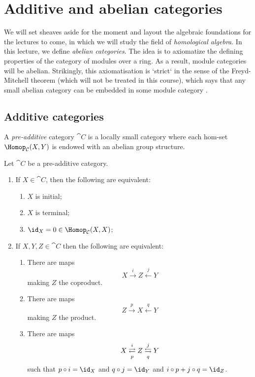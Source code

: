 \documentclass[../main.tex]{subfiles}
\begin{document}
\chapter{Additive and abelian categories}
We will set sheaves aside for the moment and layout the algebraic foundations for the lectures to come, in which we will study the field of \emph{homological algebra}. In this lecture, we define \emph{abelian categories}. The idea is to axiomatize the defining properties of the category of modules over a ring. As a result, module categories will be abelian. Strikingly, this axiomatisation is `strict` in the sense of the Freyd-Mitchell theorem (which will not be treated in this course), which says that any small abelian category can be embedded in some module category \cite[Theorem~1.6.1]{WeibelHomologicalAlgebra}. 

\section{Additive categories}
\begin{defn}
  A \emph{pre-additive} category $\cat C$ is a locally small category where each hom-set $\Hom_{\cat C}(X, Y)$ is endowed with an abelian group structure.
\end{defn}
\begin{lem}\label{lem:pre-additive-categories-are-nice}
Let $\cat C$ be a pre-additive category.
\begin{enumerate}
  \item If $X \in \cat C$, then the following are equivalent:
  \begin{enumerate}
    \item\label{lem:pre-additive-categories-are-nice:initial} $X$ is initial;
    \item\label{lem:pre-additive-categories-are-nice:terminal} $X$ is terminal;
    \item\label{lem:pre-additive-categories-are-nice:identity-zero} $\id_X = 0 \in \Hom_{\cat C}(X,X)$;
  \end{enumerate}
  \item If $X, Y, Z \in \cat C$ then the following are equivalent:
  \begin{enumerate}
    \item\label{lem:pre-additive-categories-are-nice:coproduct} There are maps \[X \xrightarrow{i} Z \xleftarrow{j} Y\] making $Z$ the coproduct.
    \item\label{lem:pre-additive-categories-are-nice:product} There are maps \[Z \xrightarrow{p} X \xleftarrow{q} Y\] making $Z$ the product.
    \item\label{lem:pre-additive-categories-are-nice:biproduct} There are maps \[X \xrightleftarrows{i}[p] Z \xleftrightarrows{j}[q] Y\] such that $p \circ i = \id_X$ and $q \circ j = \id_Y$ and $i\circ p + j \circ q = \id_Z$.
  \end{enumerate}
\end{enumerate}
\end{lem}
\end{document}
